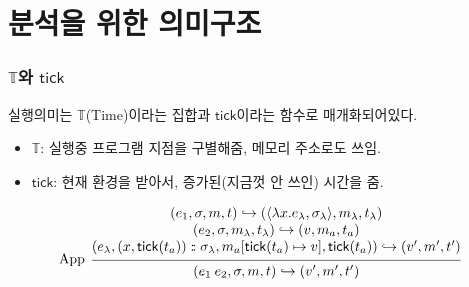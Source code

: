 \documentclass{beamer}
\theoremstyle{definition}
\newcommand*{\cons}{:{\hspace{-0.7em}}:}
\newcommand*{\Time}{\mathbb{T}}
\newcommand*{\ctx}{\sigma}
\newcommand*{\mem}{m}
\newcommand*{\semarrow}{\hookrightarrow}
\newcommand*{\tick}{\mathsf{tick}}
\begin{document}
\section{분석을 위한 의미구조}
\begin{frame}[c]
  \frametitle{$\Time$와 $\tick$}
  실행의미는 $\Time$(Time)이라는 집합과 $\tick$이라는 함수로 매개화되어있다.
  \begin{itemize}
    \item $\Time$: 실행중 프로그램 지점을 구별해줌, 메모리 주소로도 쓰임.
    \item $\tick$: 현재 환경을 받아서, 증가된(지금껏 안 쓰인) 시간을 줌.
  \end{itemize}

  {\footnotesize\[
    \begin{prooftree}
      \hypo{
        \begin{matrix}
          (e_{1}, \ctx, \mem, t)
          \semarrow
          (\langle\lambda x.e_{\lambda}, \ctx_{\lambda}\rangle, \mem_{\lambda}, t_{\lambda}) \\
          (e_{2}, \ctx, \mem_{\lambda}, t_{\lambda})
          \semarrow
          (v, \mem_{a}, t_{a})                                                               \\
          (e_{\lambda}, (x, \tick(t_{a}))\cons \ctx_{\lambda}, \mem_{a}[\tick(t_{a})\mapsto v], \tick(t_a))
          \semarrow
          (v', \mem',t')
        \end{matrix}
      }
      \infer[left label={App}]1{
      (e_{1}\:e_{2}, \ctx, \mem, t)
      \semarrow
      (v', \mem',t')
      }
    \end{prooftree}
  \]}
\end{frame}
\end{document}
